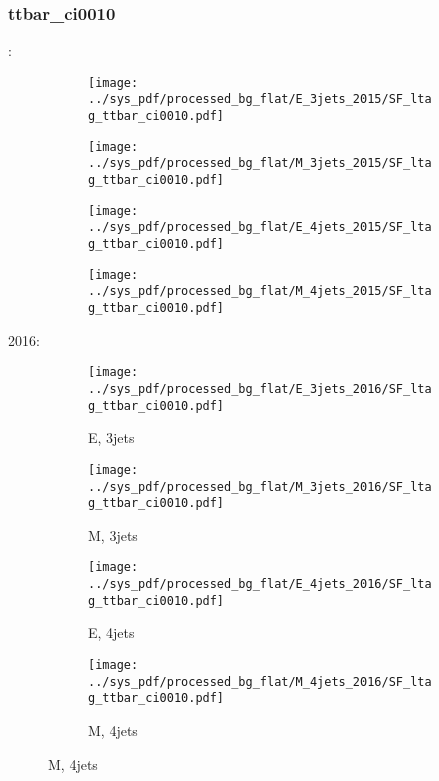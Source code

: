 \documentclass{beamer}
\begin{document}
\begin{frame}
\frametitle{ttbar_ci0010}
\fontsize{5}{1}:
\begin{figure}
\centering
\begin{subfigure}[b]{0.24\textwidth}
\texttt{[image: ../sys\_pdf/processed\_bg\_flat/E\_3jets\_2015/SF\_ltag\_ttbar\_ci0010.pdf]}
\end{subfigure}
\begin{subfigure}[b]{0.24\textwidth}
\texttt{[image: ../sys\_pdf/processed\_bg\_flat/M\_3jets\_2015/SF\_ltag\_ttbar\_ci0010.pdf]}
\end{subfigure}
\begin{subfigure}[b]{0.24\textwidth}
\texttt{[image: ../sys\_pdf/processed\_bg\_flat/E\_4jets\_2015/SF\_ltag\_ttbar\_ci0010.pdf]}
\end{subfigure}
\begin{subfigure}[b]{0.24\textwidth}
\texttt{[image: ../sys\_pdf/processed\_bg\_flat/M\_4jets\_2015/SF\_ltag\_ttbar\_ci0010.pdf]}
\end{subfigure}
\end{figure}
2016:
\begin{figure}
\centering
\begin{subfigure}[b]{0.24\textwidth}
\texttt{[image: ../sys\_pdf/processed\_bg\_flat/E\_3jets\_2016/SF\_ltag\_ttbar\_ci0010.pdf]}
\captionsetup{font=tiny}
\caption{E, 3jets}
\end{subfigure}
\begin{subfigure}[b]{0.24\textwidth}
\texttt{[image: ../sys\_pdf/processed\_bg\_flat/M\_3jets\_2016/SF\_ltag\_ttbar\_ci0010.pdf]}
\captionsetup{font=tiny}
\caption{M, 3jets}
\end{subfigure}
\begin{subfigure}[b]{0.24\textwidth}
\texttt{[image: ../sys\_pdf/processed\_bg\_flat/E\_4jets\_2016/SF\_ltag\_ttbar\_ci0010.pdf]}
\captionsetup{font=tiny}
\caption{E, 4jets}
\end{subfigure}
\begin{subfigure}[b]{0.24\textwidth}
\texttt{[image: ../sys\_pdf/processed\_bg\_flat/M\_4jets\_2016/SF\_ltag\_ttbar\_ci0010.pdf]}
\captionsetup{font=tiny}
\caption{M, 4jets}
\end{subfigure}
\end{figure}
\end{frame}
\end{document}
